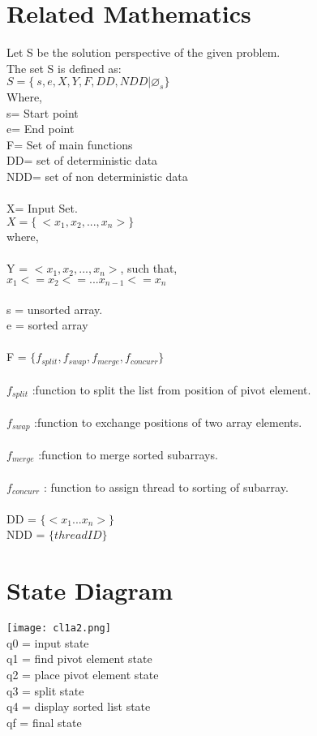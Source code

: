 \documentclass[10pt,a4paper]{article}
\begin{document}
\section{Related Mathematics}
Let S be the solution perspective of the given problem.
\\The set S is defined as:
\\$S=\lbrace\ s,e,X,Y,F,DD,NDD|\varnothing_{s}\rbrace$
\\Where,
\\s= Start point 
\\e= End point 
\\F= Set of main functions
\\DD= set of deterministic data
\\NDD= set of non deterministic data
\\\\X= Input Set.
\\$X=\lbrace\ <x_{1}, x_{2}, ... ,x_{n}> \rbrace$
\\where,
\\\\ Y = $<x_{1}, x_{2}, ... ,x_{n}>$, such that,
\\$x_{1} <= x_{2} <= ... x_{n-1} <= x_{n}$
\\\\ s = unsorted array.
\\ e = sorted array
\\\\ F = $\lbrace f_{split}, f_{swap}, f_{merge}, f_{concurr} \rbrace$
\\\\$f_{split}$  :function to split the list from position of pivot element.
\\\\ $f_{swap}$ :function to exchange positions of two array elements.
\\\\ $f_{merge}$ :function to merge sorted subarrays.
\\\\ $f_{concurr}$ : function to assign thread to sorting of subarray.
\\\\ DD = $\lbrace <x_{1}...x_{n}> \rbrace$
\\ NDD = $\lbrace thread ID \rbrace$


\section{State Diagram}
\texttt{[image: cl1a2.png]}
\\q0 = input state
\\q1 = find pivot element state
\\q2 = place pivot element state
\\q3 = split state
\\q4 = display sorted list state
\\qf = final state
\end{document}
